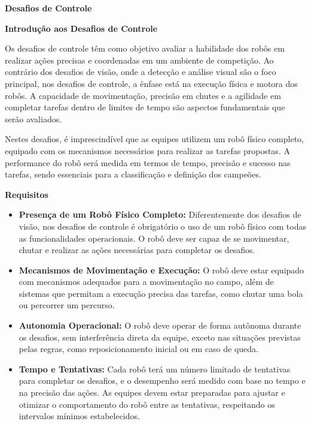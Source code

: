 \clearpage
\sffamily
{\bfseries\color[rgb]{0.4,0.4,0.4}Desafios de Controle}
{}

\bigskip

{\bfseries Introdução aos Desafios de Controle}

\headlinebox

Os desafios de controle têm como objetivo avaliar a habilidade dos robôs em realizar ações precisas e coordenadas em um ambiente de competição. Ao contrário dos desafios de visão, onde a detecção e análise visual são o foco principal, nos desafios de controle, a ênfase está na execução física e motora dos robôs. A capacidade de movimentação, precisão em chutes e a agilidade em completar tarefas dentro de limites de tempo são aspectos fundamentais que serão avaliados.

Nestes desafios, é imprescindível que as equipes utilizem um robô físico completo, equipado com os mecanismos necessários para realizar as tarefas propostas. A performance do robô será medida em termos de tempo, precisão e sucesso nas tarefas, sendo essenciais para a classificação e definição dos campeões.

\bigskip

{\bfseries Requisitos}

\headlinebox

\begin{itemize}
	\item \textbf{Presença de um Robô Físico Completo:} Diferentemente dos desafios de visão, nos desafios de controle é obrigatório o uso de um robô físico com todas as funcionalidades operacionais. O robô deve ser capaz de se movimentar, chutar e realizar as ações necessárias para completar os desafios.
	\item \textbf{Mecanismos de Movimentação e Execução:} O robô deve estar equipado com mecanismos adequados para a movimentação no campo, além de sistemas que permitam a execução precisa das tarefas, como chutar uma bola ou percorrer um percurso.
	\item \textbf{Autonomia Operacional:} O robô deve operar de forma autônoma durante os desafios, sem interferência direta da equipe, exceto nas situações previstas pelas regras, como reposicionamento inicial ou em caso de queda.
	\item \textbf{Tempo e Tentativas:} Cada robô terá um número limitado de tentativas para completar os desafios, e o desempenho será medido com base no tempo e na precisão das ações. As equipes devem estar preparadas para ajustar e otimizar o comportamento do robô entre as tentativas, respeitando os intervalos mínimos estabelecidos.
\end{itemize}